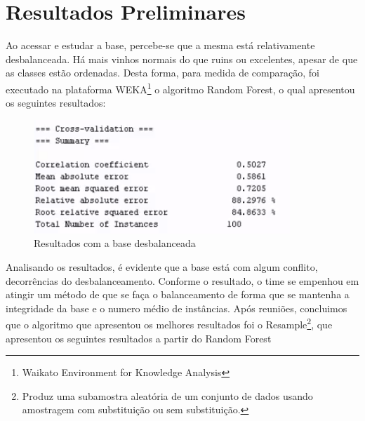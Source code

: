 \documentclass[12pt]{article}
\begin{document}
\section{Resultados Preliminares}


Ao acessar e estudar a base, percebe-se que a mesma está relativamente desbalanceada. 
Há mais vinhos normais do que ruins ou excelentes, apesar de que as classes estão ordenadas.
Desta forma, para medida de comparação, foi executado na plataforma WEKA\footnote{
	Waikato Environment for Knowledge Analysis
} o algoritmo Random Forest, o qual apresentou os seguintes resultados: 

\begin{figure}[h]
	\begin{small}
		\begin{center}
			\includegraphics[]{figures/1.png}
		\end{center}
		\caption{Resultados com a base desbalanceada}
		\label{fig:unballanced}
	\end{small}
\end{figure}



Analisando os resultados, é evidente que a base está com algum conflito, decorrências do desbalanceamento. 
Conforme o resultado, o time se empenhou em atingir um método de que se faça o balanceamento de forma que se mantenha a integridade da base e o numero médio de instâncias.
Após reuniões, concluimos que o algoritmo que apresentou os melhores resultados foi o Resample\footnote{
	Produz uma subamostra aleatória de um conjunto de dados usando amostragem com substituição ou sem substituição.
}, que apresentou os seguintes resultados a partir do Random Forest
\end{document}
